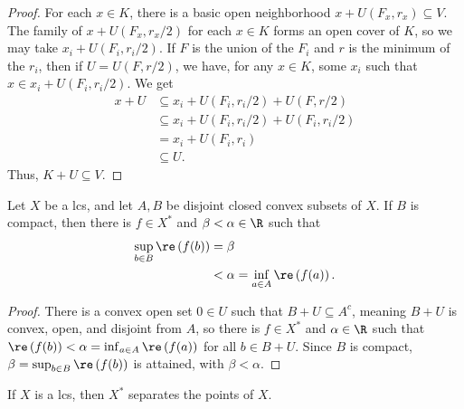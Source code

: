 \documentclass[10pt]{mypackage}
\begin{document}
\begin{proof}
  For each $x\in K$, there is a basic open neighborhood $x + U\left( F_x,r_x \right)\subseteq V$. The family of $x + U\left( F_x,r_x/2 \right)$ for each $x\in K$ forms an open cover of $K$, so we may take $x_i + U\left( F_i,r_i/2 \right)$. If $F$ is the union of the $F_i$ and $r$ is the minimum of the $r_i$, then if $U = U\left( F,r/2 \right)$, we have, for any $x\in K$, some $x_i$ such that $x\in x_i + U\left( F_i,r_i/2 \right)$. We get
  \begin{align*}
    x + U &\subseteq x_i + U\left( F_i,r_i/2 \right) + U\left( F,r/2 \right)\\
          &\subseteq x_i + U\left( F_i,r_i/2 \right) + U\left( F_i,r_i/2 \right)\\
          &= x_i + U\left( F_i,r_i \right)\\
          &\subseteq U.
  \end{align*}
  Thus, $K + U\subseteq V$.
\end{proof}
\begin{corollary}
  Let $X$ be a lcs, and let $A,B$ be disjoint closed convex subsets of $X$. If $B$ is compact, then there is $f\in X^{\ast}$ and $\beta < \alpha\in \R$ such that
  \begin{align*}
    \sup_{b\in B} \re\left( f(b) \right) &= \beta\\
                                         &< \alpha = \inf_{a\in A}\re\left( f(a) \right).
  \end{align*}
\end{corollary}
\begin{proof}
  There is a convex open set $0\in U$ such that $B + U\subseteq A^{c}$, meaning $B + U$ is convex, open, and disjoint from $A$, so there is $f\in X^{\ast}$ and $\alpha\in \R$ such that $\re\left( f(b) \right) < \alpha = \inf_{a\in A}\re\left( f(a) \right)$ for all $b\in B + U$. Since $B$ is compact, $\beta=\sup_{b\in B}\re\left( f(b) \right)$ is attained, with $\beta < \alpha$.
\end{proof}
\begin{corollary}
  If $X$ is a lcs, then $X^{\ast}$ separates the points of $X$.
\end{corollary}
\end{document}
